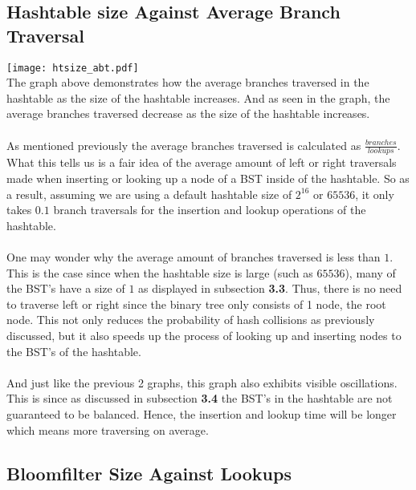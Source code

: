 \documentclass[
	12pt, %
]{fphw}
\begin{document}
\subsection{Hashtable size Against Average Branch Traversal}

\texttt{[image: htsize\_abt.pdf]}
\\
The graph above demonstrates how the average branches traversed in the hashtable as the size of the hashtable increases. And as seen in the graph, the average branches traversed decrease as the size of the hashtable increases. \\
\\
As mentioned previously the average branches traversed is calculated as $\frac{branches}{lookups}$. What this tells us is a fair idea of the average amount of left or right traversals made when inserting or looking up a node of a BST inside of the hashtable. So as a result, assuming we are using a default hashtable size of $2^{16}$ or $65536$, it only takes $0.1$ branch traversals for the insertion and lookup operations of the hashtable. \\
\\
One may wonder why the average amount of branches traversed is less than $1$. This is the case since when the hashtable size is large (such as $65536$), many of the BST's have a size of $1$ as displayed in subsection \textbf{3.3}. Thus, there is no need to traverse left or right since the binary tree only consists of 1 node, the root node. This not only reduces the probability of hash collisions as previously discussed, but it also speeds up the process of looking up and inserting nodes to the BST's of the hashtable. \\
\\
And just like the previous 2 graphs, this graph also exhibits visible oscillations. This is since as discussed in subsection \textbf{3.4} the BST's in the hashtable are not guaranteed to be balanced. Hence, the insertion and lookup time will be longer which means more traversing on average.

\subsection{Bloomfilter Size Against Lookups}
\end{document}
